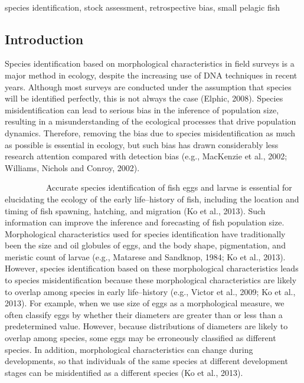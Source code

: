 \documentclass[12pt]{article}
\begin{document}
\\
species identification, stock assessment, retrospective bias, small pelagic fish

\newpage
\begin{linenumbers}
\section{Introduction}
Species identification based on morphological characteristics in field surveys is a major method in ecology, despite the increasing use of DNA techniques in recent years. Although most surveys are conducted under the assumption that species will be  identified perfectly, this is not always the case (Elphic, 2008). Species misidentification can lead to serious bias in the inference of population size, resulting in a misunderstanding of the ecological processes that drive population dynamics. Therefore, removing the bias due to species misidentification as much as possible is essential in ecology, but such bias has drawn considerably less research attention compared with detection bias (e.g., MacKenzie et al., 2002; Williams, Nichols and Conroy, 2002).

\ \ \ \ \ \ \ \ \ \ 
Accurate species identification of fish eggs and larvae is essential for elucidating the ecology of the early life--history of fish, including the location and timing of fish spawning, hatching, and migration (Ko et al., 2013). Such information can improve the inference and forecasting of fish population size. Morphological characteristics used for species identification have traditionally been the size and oil globules of eggs, and the body shape, pigmentation, and meristic count of larvae (e.g., Matarese and Sandknop, 1984; Ko et al., 2013). However, species identification based on these morphological characteristics leads to species misidentification because these morphological characteristics are likely to overlap among species in early life--history (e.g., Victor et al., 2009; Ko et al., 2013). For example, when we use size of eggs as a morphological measure, we often classify eggs by whether their diameters are greater than or less than a predetermined value. However, because distributions of diameters are likely to overlap among species, some eggs may be erroneously classified as different species. In addition, morphological characteristics can change during developments, so that individuals of the same species at different development stages can be misidentified as a different species (Ko et al., 2013). 


\end{linenumbers}
\end{document}
